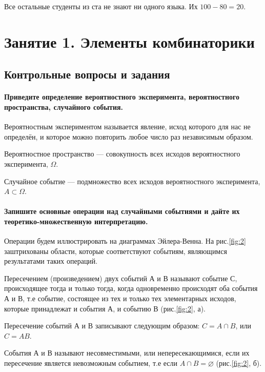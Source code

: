 \documentclass{book}
\begin{document}
Все остальные студенты из ста не знают ни одного языка. Их $100-80=20$.

\chapter*{Занятие 1. Элементы комбинаторики}

\section*{Контрольные вопросы и задания}

\subsubsection*{Приведите определение вероятностного эксперимента, вероятностного пространства, случайного события.}

Вероятностным экспериментом называется явление, исход которого для нас не определён, и которое можно повторить любое число раз независимым образом.

Вероятностное пространство --- совокупность всех исходов вероятностного эксперимента, $\Omega$.

Случайное событие --- подмножество всех исходов вероятностного эксперимента, $A\subset\Omega$.

\subsubsection*{Запишите основные операции над случайными событиями и дайте их теоретико-множественную интерпретацию.}

Операции будем иллюстрировать на диаграммах Эйлера-Венна. На рис.\ref{fig:2} заштрихованы области, которые соответствуют событиям, являющимся результатами таких операций.

Пересечением (произведением) двух событий А и В называют событие С, происходящее тогда и только тогда, когда одновременно происходят оба события А и В, т.е событие, состоящее из тех и только тех элементарных исходов, которые принадлежат и события А, и событию В (рис.\ref{fig:2}, а).

Пересечение событий А и В записывают следующим образом: $C=A\cap B$, или $C=AB$.

События А и В называют несовместимыми, или непересекающимися, если их пересечение является невозможным событием, т.е если $A\cap B=\varnothing$ (рис.\ref{fig:2}, б).
\end{document}
